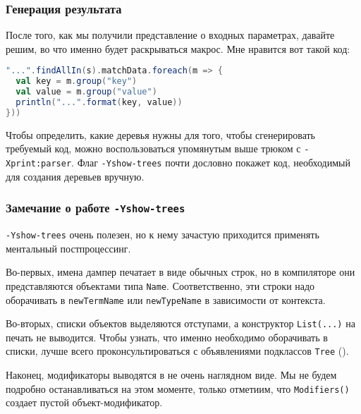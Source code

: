 \documentclass[hyperref={bookmarks=false}]{beamer}
\begin{document}
\begin{frame}[t,fragile]
\frametitle{Генерация результата}

После того, как мы получили представление о входных параметрах, давайте решим, во что именно будет раскрываться макрос. Мне нравится вот такой код:

\begin{lstlisting}[language=scala]
"...".findAllIn(s).matchData.foreach(m => {
  val key = m.group("key")
  val value = m.group("value")
  println("...".format(key, value))
}))
\end{lstlisting}

Чтобы определить, какие деревья нужны для того, чтобы сгенерировать требуемый код, можно воспользоваться упомянутым выше трюком с \texttt{-Xprint:parser}. Флаг \texttt{-Yshow-trees} почти дословно покажет код, необходимый для создания деревьев вручную.
\end{frame}

\begin{frame}[t,fragile]
\frametitle{Замечание о работе \texttt{-Yshow-trees}}

\texttt{-Yshow-trees} очень полезен, но к нему зачастую приходится применять ментальный постпроцессинг.

Во-первых, имена дампер печатает в виде обычных строк, но в компиляторе они представляются объектами типа \texttt{Name}. Соответственно, эти строки надо оборачивать в \texttt{newTermName} или \texttt{newTypeName} в зависимости от контекста.

Во-вторых, списки объектов выделяются отступами, а конструктор \texttt{List(...)} на печать не выводится. Чтобы узнать, что именно необходимо оборачивать в списки, лучше всего проконсультироваться с объявлениями подклассов \texttt{Tree} ().

Наконец, модификаторы выводятся в не очень наглядном виде. Мы не будем подробно останавливаться на этом моменте, только отметиим, что \texttt{Modifiers()} создает пустой объект-модификатор.
\end{frame}
\end{document}
